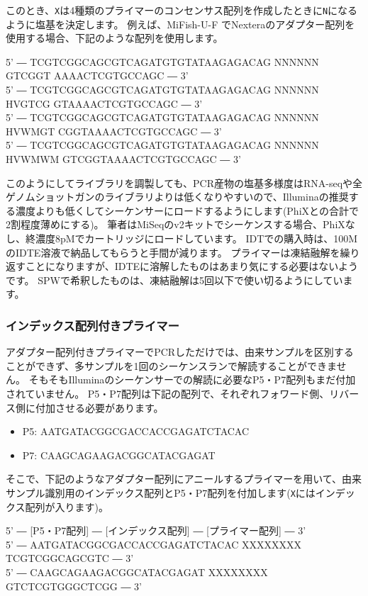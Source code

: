 \documentclass[titlepage,10pt,a4paper,uplatex]{jsbook}
\newenvironment{pre}{\begin{leftbar}\raggedright\ttfamily\footnotesize\setlength{\baselineskip}{1.4em}}{\end{leftbar}\vspace{-1em}}
\begin{document}
このとき、\texttt{X}は4種類のプライマーのコンセンサス配列を作成したときに\texttt{N}になるように塩基を決定します。
例えば、MiFish-U-F \citep{Miya2015}でNexteraのアダプター配列を使用する場合、下記のような配列を使用します。

\begin{pre}
5' ― TCGTCGGCAGCGTCAGATGTGTATAAGAGACAG NNNNNN GTCGGT AAAACTCGTGCCAGC ― 3'\\
5' ― TCGTCGGCAGCGTCAGATGTGTATAAGAGACAG NNNNNN HVGTCG GTAAAACTCGTGCCAGC ― 3'\\
5' ― TCGTCGGCAGCGTCAGATGTGTATAAGAGACAG NNNNNN HVWMGT CGGTAAAACTCGTGCCAGC ― 3'\\
5' ― TCGTCGGCAGCGTCAGATGTGTATAAGAGACAG NNNNNN HVWMWM GTCGGTAAAACTCGTGCCAGC ― 3'
\end{pre}

このようにしてライブラリを調製しても、PCR産物の塩基多様度はRNA-seqや全ゲノムショットガンのライブラリよりは低くなりやすいので、Illuminaの推奨する濃度よりも低くしてシーケンサーにロードするようにします(PhiXとの合計で2割程度薄めにする)。
筆者はMiSeqのv2キットでシーケンスする場合、PhiXなし、終濃度8pMでカートリッジにロードしています。
IDTでの購入時は、100{\textmu}MのIDTE溶液で納品してもらうと手間が減ります。
プライマーは凍結融解を繰り返すことになりますが、IDTEに溶解したものはあまり気にする必要はないようです\citep{Speicher2017}。
SPWで希釈したものは、凍結融解は5回以下で使い切るようにしています。

\subsubsection{インデックス配列付きプライマー}

アダプター配列付きプライマーでPCRしただけでは、由来サンプルを区別することができず、多サンプルを1回のシーケンスランで解読することができません。
そもそもIlluminaのシーケンサーでの解読に必要なP5・P7配列もまだ付加されていません。
P5・P7配列は下記の配列で、それぞれフォワード側、リバース側に付加させる必要があります。

\begin{itemize}
\item P5: AATGATACGGCGACCACCGAGATCTACAC
\item P7: CAAGCAGAAGACGGCATACGAGAT
\end{itemize}

そこで、下記のようなアダプター配列にアニールするプライマーを用いて、由来サンプル識別用のインデックス配列とP5・P7配列を付加します(\texttt{X}にはインデックス配列が入ります)。

\begin{pre}
5' ― [P5・P7配列] ― [インデックス配列] ― [プライマー配列] ― 3'\\
5' ― AATGATACGGCGACCACCGAGATCTACAC XXXXXXXX TCGTCGGCAGCGTC ― 3'\\
5' ― CAAGCAGAAGACGGCATACGAGAT XXXXXXXX GTCTCGTGGGCTCGG ― 3'
\end{pre}
\end{document}

